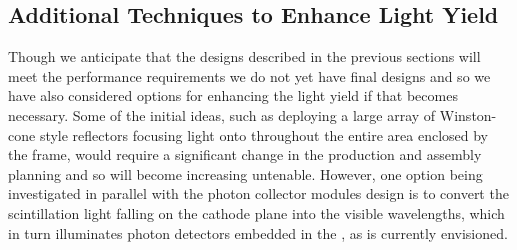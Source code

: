 



\subsection{Additional Techniques to Enhance Light Yield}
\label{sec:fdsp-pd-enh}


Though we anticipate that the designs described in the previous sections will meet the  performance requirements we do not yet have final designs and so we have also considered options for enhancing the light yield if that becomes necessary. Some of the initial ideas, such as deploying a large array of Winston-cone style reflectors focusing light onto  throughout the entire area enclosed by the  frame, would require a significant change in the  production and assembly planning and so will become increasing untenable.  However, one option being investigated in parallel with the photon collector modules design is to convert the scintillation light falling on the cathode plane into the visible wavelengths, which in turn illuminates  photon detectors embedded in the , as is currently envisioned.

